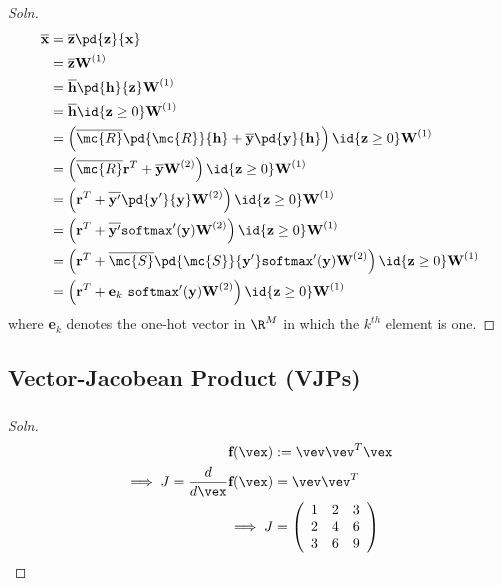 \documentclass{article}
\begin{document}
	\subsubsection{}
	\begin{proof}[Soln]
		\begin{align}
			\overline{\textbf{x}} &= \overline{\textbf{z}} \pd{\textbf{z}}{\textbf{x}}\\
			&= \overline{\textbf{z}} \textbf{W}^{(1)} \\
			&= \overline{\textbf{h}} \pd{\textbf{h}}{\textbf{z}} \textbf{W}^{(1)} \\
			&= \overline{\textbf{h}} \id{\textbf{z} \geq 0} \textbf{W}^{(1)} \\
			&= \left (
			\overline{\mc{R}} \pd{\mc{R}}{\textbf{h}}
			+ \overline{\textbf{y}} \pd{\textbf{y}}{\textbf{h}}
			\right)
			\id{\textbf{z} \geq 0} \textbf{W}^{(1)} \\
			&= \left (
			\overline{\mc{R}} \textbf{r}^T
			+ \overline{\textbf{y}} \textbf{W}^{(2)}
			\right)
			\id{\textbf{z} \geq 0} \textbf{W}^{(1)} \\
			&= \left (
			\textbf{r}^T
			+ \overline{\textbf{y}'} \pd{\textbf{y}'}{\textbf{y}} \textbf{W}^{(2)}
			\right)
			\id{\textbf{z} \geq 0} \textbf{W}^{(1)} \\
			&= \left (
			\textbf{r}^T
			+ \overline{\textbf{y}'} \texttt{softmax}'(\textbf{y}) \textbf{W}^{(2)}
			\right)
			\id{\textbf{z} \geq 0} \textbf{W}^{(1)} \\
			&= \left (
			\textbf{r}^T
			+ \overline{\mc{S}} \pd{\mc{S}}{\textbf{y}'} \texttt{softmax}'(\textbf{y}) \textbf{W}^{(2)}
			\right)
			\id{\textbf{z} \geq 0} \textbf{W}^{(1)} \\
			&= \left (
			\textbf{r}^T
			+ \textbf{e}_k\ \texttt{softmax}'(\textbf{y}) \textbf{W}^{(2)}
			\right)
			\id{\textbf{z} \geq 0} \textbf{W}^{(1)}
		\end{align}
		where \textbf{e}$_k$ denotes the one-hot vector in $\R^M$ in which the $k^{th}$ element is one.
	\end{proof}
	\subsection{Vector-Jacobean Product (VJPs)}
	\subsubsection{}
	\begin{proof}[Soln]
		\begin{align}
			\textbf{f}(\vex) &:= \vev \vev^T \vex \\
			\implies J = \frac{d}{d\vex} \textbf{f}(\vex) &= \vev \vev^T \\
			\implies J &=
			\left(
			\begin{array}{ccc}
			 1 & 2 & 3 \\
			 2 & 4 & 6 \\
			 3 & 6 & 9 \\
			\end{array}
			\right)
		\end{align}
	\end{proof}
	
\end{document}
